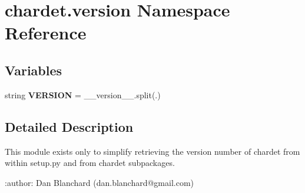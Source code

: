 \hypertarget{namespacechardet_1_1version}{}\section{chardet.\+version Namespace Reference}
\label{namespacechardet_1_1version}
\subsection*{Variables}
\begin{DoxyCompactItemize}
\item 
\mbox{\label{namespacechardet_1_1version_accc3bc4f7e934b91f0c19e99a1ba3730}} 
string {\bfseries V\+E\+R\+S\+I\+ON} = \+\_\+\+\_\+version\+\_\+\+\_\+.\+split(\textquotesingle{}.\textquotesingle{})
\end{DoxyCompactItemize}


\subsection{Detailed Description}
\begin{DoxyVerb}This module exists only to simplify retrieving the version number of chardet
from within setup.py and from chardet subpackages.

:author: Dan Blanchard (dan.blanchard@gmail.com)
\end{DoxyVerb}
 